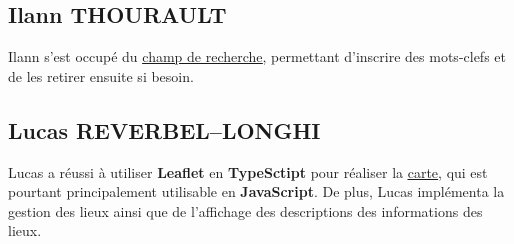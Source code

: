 \documentclass[12pt]{article}
\begin{document}
\subsection{Ilann THOURAULT}
Ilann s'est occupé du \underline{\hyperref[item:champ]{champ de recherche}}, permettant d'inscrire des mots-clefs et de les retirer ensuite si besoin.

\subsection{Lucas REVERBEL--LONGHI}
Lucas a réussi à utiliser \textbf{Leaflet} en \textbf{TypeSctipt} pour réaliser la \underline{\hyperref[item:carte]{carte}}, qui est pourtant principalement utilisable en \textbf{JavaScript}. De plus, Lucas implémenta la gestion des lieux ainsi que de l'affichage des descriptions des informations des lieux.
\end{document}

